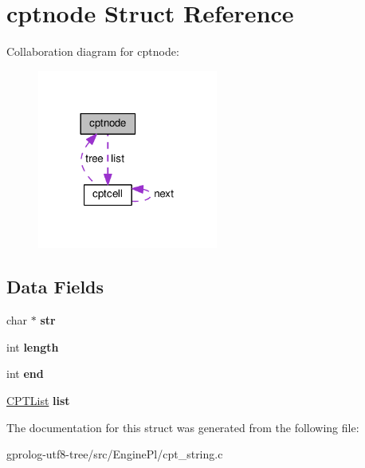 \hypertarget{structcptnode}{}\section{cptnode Struct Reference}
\label{structcptnode}


Collaboration diagram for cptnode\+:\nopagebreak
\begin{figure}[H]
\begin{center}
\leavevmode
\includegraphics[width=168pt]{structcptnode__coll__graph}
\end{center}
\end{figure}
\subsection*{Data Fields}
\begin{DoxyCompactItemize}
\item 
char $\ast$ {\bfseries str}\hypertarget{structcptnode_a0f39bf735e3c110c5559c56a2865e3e6}{}\label{structcptnode_a0f39bf735e3c110c5559c56a2865e3e6}

\item 
int {\bfseries length}\hypertarget{structcptnode_a18110f6aa5dcbadb7233fb49ee931ee2}{}\label{structcptnode_a18110f6aa5dcbadb7233fb49ee931ee2}

\item 
int {\bfseries end}\hypertarget{structcptnode_aa3b17740356cb0b60a9bac4f1ee7534d}{}\label{structcptnode_aa3b17740356cb0b60a9bac4f1ee7534d}

\item 
\hyperlink{structcptcell}{C\+P\+T\+List} {\bfseries list}\hypertarget{structcptnode_a957239c445f0b92b306830b91603b8e0}{}\label{structcptnode_a957239c445f0b92b306830b91603b8e0}

\end{DoxyCompactItemize}


The documentation for this struct was generated from the following file\+:\begin{DoxyCompactItemize}
\item 
gprolog-\/utf8-\/tree/src/\+Engine\+Pl/cpt\+\_\+string.\+c\end{DoxyCompactItemize}
